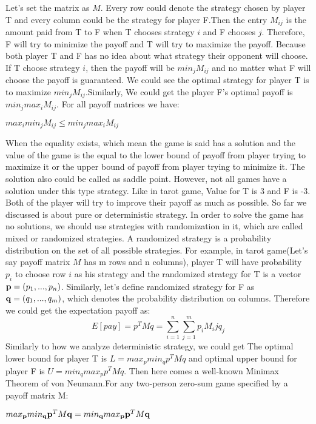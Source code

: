 Let's set the matrix as $M$. Every row could denote the strategy chosen by player T and every column could be the strategy for player F.Then the entry $M_{ij}$ is the amount paid from T to F when T chooses strategy $i$ and F chooses $j$. Therefore, F will try to minimize the payoff and T will try to maximize the payoff. Because both player T and F has no idea about what strategy their opponent will choose. If T choose strategy $i$, then the payoff will be $min_jM_{ij}$ and no matter what F will choose the payoff is guaranteed. We could see the optimal strategy for player T is to maximize $min_jM_{ij}$.Similarly, We could get the player F's optimal payoff is $min_jmax_iM_{ij}$. For all payoff matrices we have:
\begin{lemma}
	$max_imin_jM_{ij} \le min_jmax_iM_{ij}$
\end{lemma}  
When the equality exists, which mean the game is said has a solution and the value of the game is the equal to the lower bound of payoff from player trying to maximize it or the upper bound of payoff from player trying to minimize it. The solution also could be called as saddle point\cite{SA}. However, not all games have a solution under this type strategy. Like in tarot game, Value for T is 3 and F is -3. Both of the player will try to improve their payoff as much as possible. So far we discussed is about pure or deterministic strategy. In order to solve the game has no solutions, we should use strategies with randomization in it, which are called mixed or randomized strategies. A randomized strategy is a probability distribution on the set of all possible strategies. For example, in tarot game(Let's say payoff matrix $M$ has m rows and n columns), player T will have probability $p_i$ to choose row $i$ as his strategy and the randomized strategy for T is a vector $\mathbf{p} = (p_1,...,p_n)$. Similarly, let's define randomized strategy for F as $\mathbf{q} = (q_1,...,q_m)$, which denotes the probability distribution on columns. Therefore we could get the expectation payoff as:
$$ E[pay] = p^TMq = \sum_{i=1}^{n}\sum_{j=1}^{m}p_iM_ijq_j$$   
Similarly to how we analyze deterministic strategy, we could get The optimal lower bound for player T is $L = max_pmin_qp^TMq$ and optimal upper bound for player F is $U=min_qmax_pp^TMq$. Then here comes a well-known Minimax Theorem of von Neumann\cite{VON}.For any two-person zero-sum game specified by a payoff matrix M:
\begin{theorem}
	$max_{\mathbf{p}}min_{\mathbf{q}}\mathbf{p}^TM\mathbf{q} = min_{\mathbf{q}}max_{\mathbf{p}}\mathbf{p}^TM\mathbf{q}$
\end{theorem}
